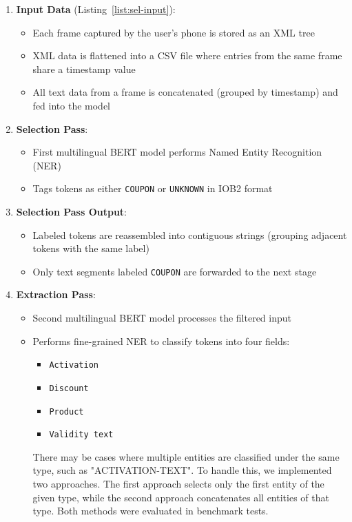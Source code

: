 \documentclass[licencjacka,en]{pracamgr}
\begin{document}
\begin{enumerate}
    \item \textbf{Input Data} (Listing~\ref{list:sel-input}):
    \begin{itemize}
        \item Each frame captured by the user's phone is stored as an XML tree
        \item XML data is flattened into a CSV file where entries from the same frame share a timestamp value
        \item All text data from a frame is concatenated (grouped by timestamp) and fed into the model
    \end{itemize}

    \item \textbf{Selection Pass}:
    \begin{itemize}
        \item First multilingual BERT model performs Named Entity Recognition (NER)
        \item Tags tokens as either \texttt{COUPON} or \texttt{UNKNOWN} in IOB2 format~\cite{iob2}
    \end{itemize}

    \item \textbf{Selection Pass Output}:
    \begin{itemize}
        \item Labeled tokens are reassembled into contiguous strings (grouping adjacent tokens with the same label)
        \item Only text segments labeled \texttt{COUPON} are forwarded to the next stage
    \end{itemize}

    \item \textbf{Extraction Pass}:
    \begin{itemize}
        \item Second multilingual BERT model processes the filtered input
        \item Performs fine-grained NER to classify tokens into four fields:
        \begin{itemize}
            \item \texttt{Activation}
            \item \texttt{Discount}
            \item \texttt{Product}
            \item \texttt{Validity text}
        \end{itemize}
        There may be cases where multiple entities are classified under the same type, such as "ACTIVATION-TEXT". To handle this, we implemented two approaches. The first approach selects only the first entity of the given type, while the second approach concatenates all entities of that type. Both methods were evaluated in benchmark tests.
    \end{itemize}


\end{enumerate}
\end{document}
